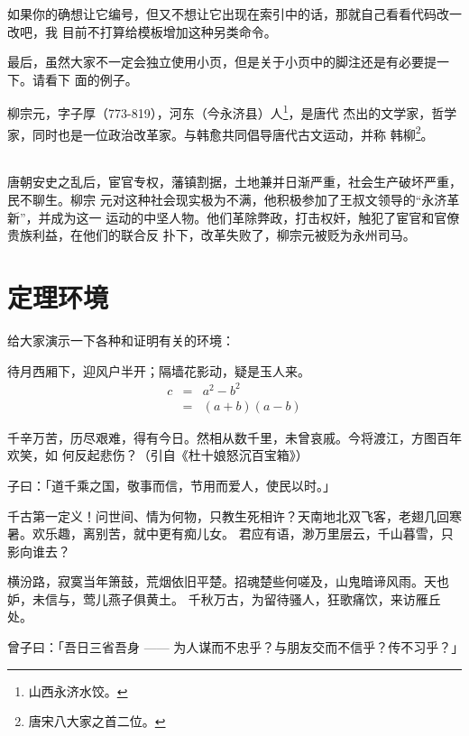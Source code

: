 如果你的确想让它编号，但又不想让它出现在索引中的话，那就自己看看代码改一改吧，我
目前不打算给模板增加这种另类命令。

最后，虽然大家不一定会独立使用小页，但是关于小页中的脚注还是有必要提一下。请看下
面的例子。

\begin{minipage}[t]{\linewidth-2\parindent}
  柳宗元，字子厚（773-819），河东（今永济县）人\footnote{山西永济水饺。}，是唐代
  杰出的文学家，哲学家，同时也是一位政治改革家。与韩愈共同倡导唐代古文运动，并称
  韩柳\footnote{唐宋八大家之首二位。}。
\end{minipage}\\[-5pt]

唐朝安史之乱后，宦官专权，藩镇割据，土地兼并日渐严重，社会生产破坏严重，民不聊生。柳宗
元对这种社会现实极为不满，他积极参加了王叔文领导的“永济革新”，并成为这一
运动的中坚人物。他们革除弊政，打击权奸，触犯了宦官和官僚贵族利益，在他们的联合反
扑下，改革失败了，柳宗元被贬为永州司马。

\section{定理环境}
\label{sec:theorem}

给大家演示一下各种和证明有关的环境：

\begin{assumption}
待月西厢下，迎风户半开；隔墙花影动，疑是玉人来。
\begin{eqnarray}
  \label{eq:eqnxmp}
  c & = & a^2 - b^2\\
    & = & (a+b)(a-b)
\end{eqnarray}
\end{assumption}

千辛万苦，历尽艰难，得有今日。然相从数千里，未曾哀戚。今将渡江，方图百年欢笑，如
何反起悲伤？（引自《杜十娘怒沉百宝箱》）

\begin{definition}
子曰：「道千乘之国，敬事而信，节用而爱人，使民以时。」
\end{definition}

千古第一定义！问世间、情为何物，只教生死相许？天南地北双飞客，老翅几回寒暑。欢乐趣，离别苦，就中更有痴儿女。
君应有语，渺万里层云，千山暮雪，只影向谁去？

横汾路，寂寞当年箫鼓，荒烟依旧平楚。招魂楚些何嗟及，山鬼暗谛风雨。天也妒，未信与，莺儿燕子俱黄土。
千秋万古，为留待骚人，狂歌痛饮，来访雁丘处。

\begin{proposition}
 曾子曰：「吾日三省吾身 —— 为人谋而不忠乎？与朋友交而不信乎？传不习乎？」
\end{proposition}

